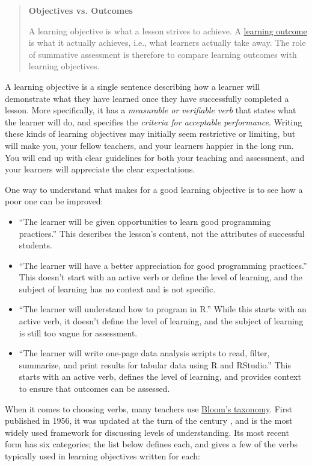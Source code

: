 \begin{quote}\setlength{\parindent}{0pt}
\textbf{Objectives vs. Outcomes}

A learning objective is what a lesson strives to achieve. A
\protect\hyperlink{g:learning-outcome}{learning outcome} is what it actually
achieves, i.e., what learners actually take away. The role of
summative assessment is therefore to compare learning outcomes with
learning objectives.
\end{quote}

A learning objective is a single sentence describing how a learner
will demonstrate what they have learned once they have successfully
completed a lesson. More specifically, it has a \emph{measurable or
verifiable verb} that states what the learner will do, and specifies
the \emph{criteria for acceptable performance}. Writing these kinds of
learning objectives may initially seem restrictive or limiting, but
will make you, your fellow teachers, and your learners happier in the
long run. You will end up with clear guidelines for both your teaching
and assessment, and your learners will appreciate the clear
expectations.

One way to understand what makes for a good learning objective is to
see how a poor one can be improved:

\begin{itemize}
\item
  ``The learner will be given opportunities to learn good programming
  practices.'' This describes the lesson's content, not the attributes
  of successful students.
\item
  ``The learner will have a better appreciation for good programming
  practices.'' This doesn't start with an active verb or define the
  level of learning, and the subject of learning has no context and is
  not specific.
\item
  ``The learner will understand how to program in R.'' While this starts
  with an active verb, it doesn't define the level of learning, and
  the subject of learning is still too vague for assessment.
\item
  ``The learner will write one-page data analysis scripts to read,
  filter, summarize, and print results for tabular data using R and
  RStudio.'' This starts with an active verb, defines the level of
  learning, and provides context to ensure that outcomes can be
  assessed.
\end{itemize}

When it comes to choosing verbs, many teachers use \protect\hyperlink{g:blooms-taxonomy}{Bloom's
taxonomy}. First published in 1956, it
was updated at the turn of the century \cite{Ande2001}, and is the
most widely used framework for discussing levels of understanding. Its
most recent form has six categories; the list below defines each, and
gives a few of the verbs typically used in learning objectives written
for each:

